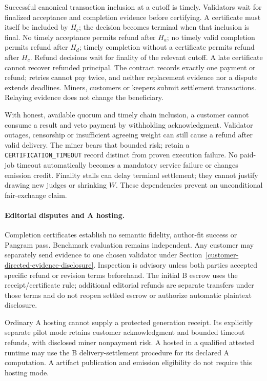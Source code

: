 Successful canonical transaction inclusion at a cutoff is timely.
Validators wait for finalized acceptance and completion evidence before
certifying. A certificate must itself be included by \(H_c\); the
decision becomes terminal when that inclusion is final. No timely
acceptance permits refund after \(H_a\); no timely valid completion
permits refund after \(H_d\); timely completion without a certificate
permits refund after \(H_c\). Refund decisions wait for finality of the
relevant cutoff. A late certificate cannot recover refunded principal.
The contract records exactly one payment or refund; retries cannot pay
twice, and neither replacement evidence nor a dispute extends deadlines.
Miners, customers or keepers submit settlement transactions. Relaying
evidence does not change the beneficiary.

With honest, available quorum and timely chain inclusion, a customer
cannot consume a result and veto payment by withholding acknowledgment.
Validator outages, censorship or insufficient agreeing weight can still
cause a refund after valid delivery. The miner bears that bounded risk;
retain a \texttt{CERTIFICATION\_TIMEOUT} record distinct from proven
execution failure. No paid-job timeout automatically becomes a mandatory
service failure or changes emission credit. Finality stalls can delay
terminal settlement; they cannot justify drawing new judges or shrinking
\(W\). These dependencies prevent an unconditional fair-exchange claim.

\paragraph{Editorial disputes and A hosting.}
Completion certificates establish no semantic fidelity, author-fit
success or Pangram pass. Benchmark evaluation remains independent.
Any customer may separately send evidence to one chosen validator under
Section~\ref{customer-directed-evidence-disclosure}. Inspection is advisory
unless both parties accepted specific refund or revision terms beforehand.
The initial B escrow uses the receipt/certificate rule; additional
editorial refunds are separate transfers under those terms and do not
reopen settled escrow or authorize automatic plaintext disclosure.

Ordinary A hosting cannot supply a protected generation receipt. Its
explicitly separate pilot mode retains customer acknowledgment and bounded
timeout refunds, with disclosed miner nonpayment risk. A hosted in a
qualified attested runtime may use the B delivery-settlement procedure
for its declared A computation. A artifact publication and emission
eligibility do not require this hosting mode.

